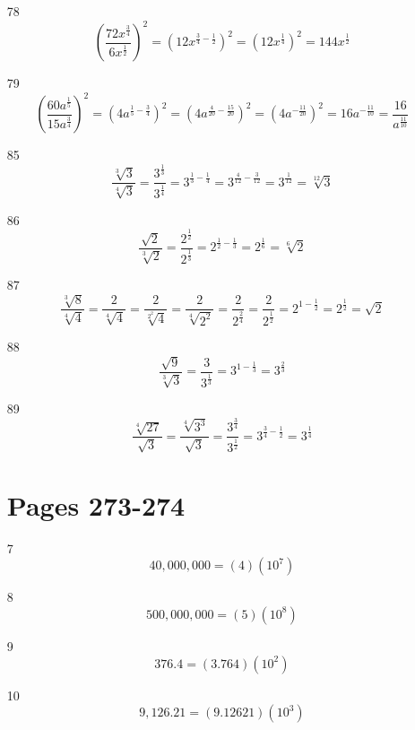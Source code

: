 \documentclass[fleqn,addpoints]{exam}
\begin{document}
\begin{itemize}
\item[78]
\[
  \left( \frac{72x^{\frac{3}{4}}}{6x^{\frac{1}{2}}} \right)^2
  = ( 12x^{\frac{3}{4} - \frac{1}{2}} )^2
  = ( 12x^{\frac{1}{4}} )^2
  = 144x^{\frac{1}{2}}
\]

\item[79]
\[
  \left( \frac{60a^{\frac{1}{5}}}{15a^{\frac{3}{4}}} \right)^2
  = ( 4a^{\frac{1}{5} - \frac{3}{4}} )^2
  = ( 4a^{\frac{4}{20} - \frac{15}{20}} )^2
  = ( 4a^{- \frac{11}{20}} )^2
  = 16a^{- \frac{11}{10}}
  = \frac{16}{a^{\frac{11}{10}}}
\]

\item[85]
\[
  \frac{\sqrt[3]{3}}{\sqrt[4]{3}}
  = \frac{3^{\frac{1}{3}}}{3^{\frac{1}{4}}}
  = 3^{\frac{1}{3} - \frac{1}{4}}
  = 3^{\frac{4}{12} - \frac{3}{12}}
  = 3^{\frac{1}{12}}
  = \sqrt[12]{3}
\]

\item[86]
\[
  \frac{\sqrt{2}}{\sqrt[3]{2}}
  = \frac{2^{\frac{1}{2}}}{2^{\frac{1}{3}}}
  = 2^{\frac{1}{2} - \frac{1}{3}}
  = 2^{\frac{1}{6}}
  = \sqrt[6]{2}
\]

\item[87]
\[
  \frac{\sqrt[3]{8}}{\sqrt[4]{4}}
  = \frac{2}{\sqrt[4]{4}}
  = \frac{2}{\sqrt[2^2]{4}}
  = \frac{2}{\sqrt[4]{2^2}}
  = \frac{2}{2^{\frac{2}{4}}}
  = \frac{2}{2^{\frac{1}{2}}}
  = 2^{1 - \frac{1}{2}}
  = 2^{\frac{1}{2}}
  = \sqrt{2}
\]

\item[88]
\[
  \frac{\sqrt{9}}{\sqrt[3]{3}}
  = \frac{3}{3^{\frac{1}{3}}}
  = 3^{1 - \frac{1}{3}}
  = 3^{\frac{2}{3}}
\]

\item[89]
\[
  \frac{\sqrt[4]{27}}{\sqrt{3}}
  = \frac{\sqrt[4]{3^3}}{\sqrt{3}}
  = \frac{3^{\frac{3}{4}}}{3^{\frac{1}{2}}}
  = 3^{\frac{3}{4} - \frac{1}{2}}
  = 3^{\frac{1}{4}}
\]

\section{Pages 273-274}

\item[7]
\[
  40,000,000 = (4)(10^7)
\]

\item[8]
\[
  500,000,000 = (5)(10^8)
\]

\item[9]
\[
  376.4 = (3.764)(10^2)
\]

\item[10]
\[
  9,126.21 = (9.12621)(10^3)
\]


\end{itemize}
\end{document}
